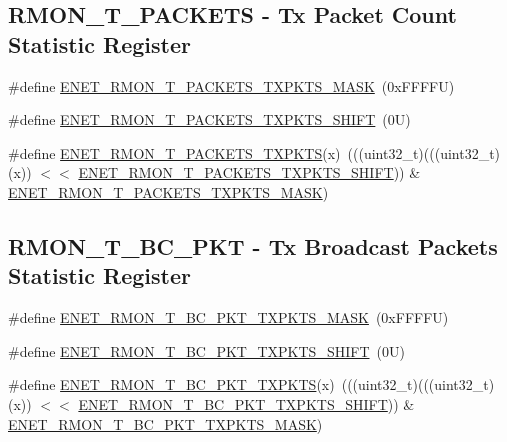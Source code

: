 \subsection*{R\+M\+O\+N\+\_\+\+T\+\_\+\+P\+A\+C\+K\+E\+TS -\/ Tx Packet Count Statistic Register}
\begin{DoxyCompactItemize}
\item 
\#define \mbox{\hyperlink{group___e_n_e_t___register___masks_gaae18bf5610b11cd5c5418e426bfc9faf}{E\+N\+E\+T\+\_\+\+R\+M\+O\+N\+\_\+\+T\+\_\+\+P\+A\+C\+K\+E\+T\+S\+\_\+\+T\+X\+P\+K\+T\+S\+\_\+\+M\+A\+SK}}~(0x\+F\+F\+F\+F\+U)
\item 
\#define \mbox{\hyperlink{group___e_n_e_t___register___masks_gaedbb5b49e8c1f579fb37ff45c77739b1}{E\+N\+E\+T\+\_\+\+R\+M\+O\+N\+\_\+\+T\+\_\+\+P\+A\+C\+K\+E\+T\+S\+\_\+\+T\+X\+P\+K\+T\+S\+\_\+\+S\+H\+I\+FT}}~(0\+U)
\item 
\#define \mbox{\hyperlink{group___e_n_e_t___register___masks_ga8e671cdf2c95c8dfd6c9260b47360901}{E\+N\+E\+T\+\_\+\+R\+M\+O\+N\+\_\+\+T\+\_\+\+P\+A\+C\+K\+E\+T\+S\+\_\+\+T\+X\+P\+K\+TS}}(x)~(((uint32\+\_\+t)(((uint32\+\_\+t)(x)) $<$$<$ \mbox{\hyperlink{group___e_n_e_t___register___masks_gaedbb5b49e8c1f579fb37ff45c77739b1}{E\+N\+E\+T\+\_\+\+R\+M\+O\+N\+\_\+\+T\+\_\+\+P\+A\+C\+K\+E\+T\+S\+\_\+\+T\+X\+P\+K\+T\+S\+\_\+\+S\+H\+I\+FT}})) \& \mbox{\hyperlink{group___e_n_e_t___register___masks_gaae18bf5610b11cd5c5418e426bfc9faf}{E\+N\+E\+T\+\_\+\+R\+M\+O\+N\+\_\+\+T\+\_\+\+P\+A\+C\+K\+E\+T\+S\+\_\+\+T\+X\+P\+K\+T\+S\+\_\+\+M\+A\+SK}})
\end{DoxyCompactItemize}
\subsection*{R\+M\+O\+N\+\_\+\+T\+\_\+\+B\+C\+\_\+\+P\+KT -\/ Tx Broadcast Packets Statistic Register}
\begin{DoxyCompactItemize}
\item 
\#define \mbox{\hyperlink{group___e_n_e_t___register___masks_ga025847a04f4151ea174abb193896779d}{E\+N\+E\+T\+\_\+\+R\+M\+O\+N\+\_\+\+T\+\_\+\+B\+C\+\_\+\+P\+K\+T\+\_\+\+T\+X\+P\+K\+T\+S\+\_\+\+M\+A\+SK}}~(0x\+F\+F\+F\+F\+U)
\item 
\#define \mbox{\hyperlink{group___e_n_e_t___register___masks_ga85a6d86c558cd12bad95c0bd1fa9ac42}{E\+N\+E\+T\+\_\+\+R\+M\+O\+N\+\_\+\+T\+\_\+\+B\+C\+\_\+\+P\+K\+T\+\_\+\+T\+X\+P\+K\+T\+S\+\_\+\+S\+H\+I\+FT}}~(0\+U)
\item 
\#define \mbox{\hyperlink{group___e_n_e_t___register___masks_ga44c8eef437f06566360fde04150c385c}{E\+N\+E\+T\+\_\+\+R\+M\+O\+N\+\_\+\+T\+\_\+\+B\+C\+\_\+\+P\+K\+T\+\_\+\+T\+X\+P\+K\+TS}}(x)~(((uint32\+\_\+t)(((uint32\+\_\+t)(x)) $<$$<$ \mbox{\hyperlink{group___e_n_e_t___register___masks_ga85a6d86c558cd12bad95c0bd1fa9ac42}{E\+N\+E\+T\+\_\+\+R\+M\+O\+N\+\_\+\+T\+\_\+\+B\+C\+\_\+\+P\+K\+T\+\_\+\+T\+X\+P\+K\+T\+S\+\_\+\+S\+H\+I\+FT}})) \& \mbox{\hyperlink{group___e_n_e_t___register___masks_ga025847a04f4151ea174abb193896779d}{E\+N\+E\+T\+\_\+\+R\+M\+O\+N\+\_\+\+T\+\_\+\+B\+C\+\_\+\+P\+K\+T\+\_\+\+T\+X\+P\+K\+T\+S\+\_\+\+M\+A\+SK}})
\end{DoxyCompactItemize}
